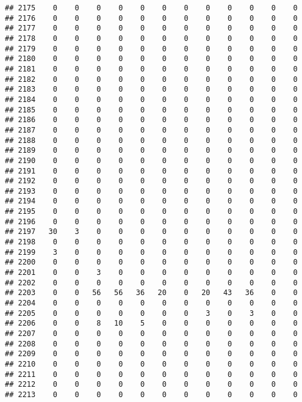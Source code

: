 \documentclass[]{article}
\begin{document}
\begin{verbatim}
## 2175    0    0    0    0    0    0    0    0    0    0    0    0
## 2176    0    0    0    0    0    0    0    0    0    0    0    0
## 2177    0    0    0    0    0    0    0    0    0    0    0    0
## 2178    0    0    0    0    0    0    0    0    0    0    0    0
## 2179    0    0    0    0    0    0    0    0    0    0    0    0
## 2180    0    0    0    0    0    0    0    0    0    0    0    0
## 2181    0    0    0    0    0    0    0    0    0    0    0    0
## 2182    0    0    0    0    0    0    0    0    0    0    0    0
## 2183    0    0    0    0    0    0    0    0    0    0    0    0
## 2184    0    0    0    0    0    0    0    0    0    0    0    0
## 2185    0    0    0    0    0    0    0    0    0    0    0    0
## 2186    0    0    0    0    0    0    0    0    0    0    0    0
## 2187    0    0    0    0    0    0    0    0    0    0    0    0
## 2188    0    0    0    0    0    0    0    0    0    0    0    0
## 2189    0    0    0    0    0    0    0    0    0    0    0    0
## 2190    0    0    0    0    0    0    0    0    0    0    0    0
## 2191    0    0    0    0    0    0    0    0    0    0    0    0
## 2192    0    0    0    0    0    0    0    0    0    0    0    0
## 2193    0    0    0    0    0    0    0    0    0    0    0    0
## 2194    0    0    0    0    0    0    0    0    0    0    0    0
## 2195    0    0    0    0    0    0    0    0    0    0    0    0
## 2196    0    0    0    0    0    0    0    0    0    0    0    0
## 2197   30    3    0    0    0    0    0    0    0    0    0    0
## 2198    0    0    0    0    0    0    0    0    0    0    0    0
## 2199    3    0    0    0    0    0    0    0    0    0    0    0
## 2200    0    0    0    0    0    0    0    0    0    0    0    0
## 2201    0    0    3    0    0    0    0    0    0    0    0    0
## 2202    0    0    0    0    0    0    0    0    0    0    0    0
## 2203    0    0   56   56   36   20    0   20   43   36    0    0
## 2204    0    0    0    0    0    0    0    0    0    0    0    0
## 2205    0    0    0    0    0    0    0    3    0    3    0    0
## 2206    0    0    8   10    5    0    0    0    0    0    0    0
## 2207    0    0    0    0    0    0    0    0    0    0    0    0
## 2208    0    0    0    0    0    0    0    0    0    0    0    0
## 2209    0    0    0    0    0    0    0    0    0    0    0    0
## 2210    0    0    0    0    0    0    0    0    0    0    0    0
## 2211    0    0    0    0    0    0    0    0    0    0    0    0
## 2212    0    0    0    0    0    0    0    0    0    0    0    0
## 2213    0    0    0    0    0    0    0    0    0    0    0    0

\end{verbatim}
\end{document}
